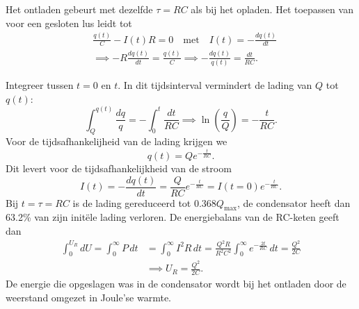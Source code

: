 Het ontladen gebeurt met dezelfde $\tau = RC$ als bij het opladen.
Het toepassen van  voor een gesloten lus leidt tot
\begin{align*}
    &\frac{q(t)}{C} - I(t)R = 0 \quad \text{met} \quad I(t) = -\frac{dq(t)}{dt} \\
    &\implies -R \frac{dq(t)}{dt} = \frac{q(t)}{C} \implies -\frac{dq(t)}{q(t)} = \frac{dt}{RC}.
\end{align*}

Integreer tussen $t=0$ en $t$.
In dit tijdsinterval vermindert de lading van $Q$ tot $q(t)$:
\[
    \int_Q^{q(t)}\frac{dq}{q} = -\int_0^t \frac{dt}{RC} \implies \ln\left(\frac{q}{Q}\right) = -\frac{t}{RC}.
\]
Voor de tijdsafhankelijheid van de lading krijgen we
\[
    q(t) = Qe^{-\frac{t}{RC}}.
\]
Dit levert voor de tijdsafhankelijkheid van de stroom
\[
    I(t) = -\frac{dq(t)}{dt} = \frac{Q}{RC}e^{-\frac{t}{RC}} = I(t=0)e^{-\frac{t}{RC}}.
\]
Bij $t=\tau=RC$ is de lading gereduceerd tot 0.368$ Q_{\text{max}}$, de condensator heeft dan 63.2\% van zijn initële lading verloren.
De energiebalans van de RC-keten geeft dan
\begin{align*}
    \int_0^{U_R}dU = \int_0^\infty P\,dt &= \int_0^\infty I^2R\, dt = \frac{Q^2R}{R^2C^2}\int_0^\infty e^{-\frac{2t}{RC}}\,dt = \frac{Q^2}{2C} \\
                   &\implies U_R = \frac{Q^2}{2C}.
\end{align*}
De energie die opgeslagen was in de condensator wordt bij het ontladen door de weerstand omgezet in Joule'se warmte.

